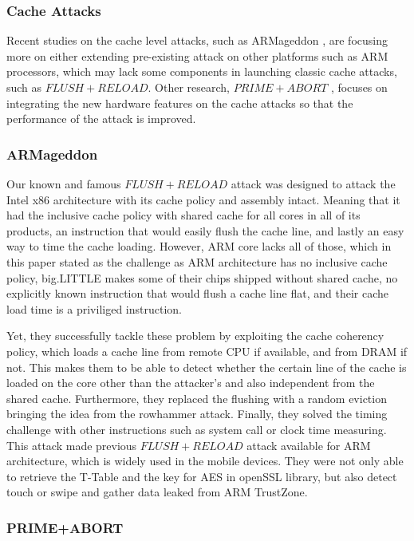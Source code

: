 \documentclass[a4paper]{article}
\begin{document}
\subsubsection{Cache Attacks}

Recent studies on the cache level attacks, such as ARMageddon \cite{lipp2016armageddon}, are focusing more on either extending pre-existing attack on other platforms such as ARM processors, which may lack some components in launching classic cache attacks, such as $FLUSH+RELOAD$. Other research, $PRIME+ABORT$ \cite{disselkoen2017prime+}, focuses on integrating the new hardware features on the cache attacks so that the performance of the attack is improved.

\subsubsection*{ARMageddon}

Our known and famous $FLUSH+RELOAD$ attack was designed to attack the Intel x86 architecture with its cache policy and assembly intact. Meaning that it had the inclusive cache policy with shared cache for all cores in all of its products, an instruction that would easily flush the cache line, and lastly an easy way to time the cache loading. However, ARM core lacks all of those, which in this paper stated as the challenge as ARM architecture has no inclusive cache policy, big.LITTLE makes some of their chips shipped without shared cache, no explicitly known instruction that would flush a cache line flat, and their cache load time is a priviliged instruction.
\par Yet, they successfully tackle these problem by exploiting the cache coherency policy, which loads a cache line from remote CPU if available, and from DRAM if not. This makes them to be able to detect whether the certain line of the cache is loaded on the core other than the attacker's and also independent from the shared cache. Furthermore, they replaced the flushing with a random eviction bringing the idea from the rowhammer attack. Finally, they solved the timing challenge with other instructions such as system call or clock time measuring. This attack made previous $FLUSH+RELOAD$ attack available for ARM architecture, which is widely used in the mobile devices. They were not only able to retrieve the T-Table and the key for AES in openSSL library, but also detect touch or swipe and gather data leaked from ARM TrustZone.

\subsubsection*{PRIME+ABORT}
\end{document}
